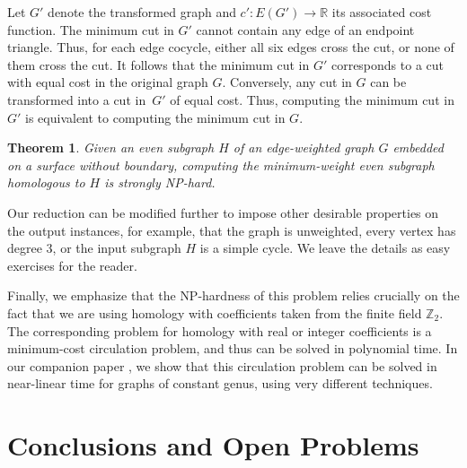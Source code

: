 \documentclass{sig-alternate}
\def\Z{\mathbb{Z}}
\def\Real{\mathbb{R}}
\newtheorem{theorem}{Theorem}[section]
\begin{document}
Let $G'$ denote the transformed graph and $c'\colon E(G')\to \Real$ its associated cost function.  The minimum cut in $G'$ cannot contain any edge of an endpoint triangle.  Thus, for each edge cocycle, either all six edges cross the cut, or none of them cross the cut.  It follows that the minimum cut in $G'$ corresponds to a cut with equal cost in the original graph $G$.  Conversely, any cut in $G$ can be transformed into a cut in~$G'$ of equal cost.  Thus, computing the minimum cut in $G'$ is equivalent to computing the minimum cut in $G$.

\begin{theorem}
Given an even subgraph $H$ of an edge-weighted graph $G$ embedded on a surface without boundary, computing the minimum-weight even subgraph homologous to $H$ is strongly {NP}-hard.
\end{theorem}

Our reduction can be modified further to impose other desirable properties on the output instances, for example, that the graph is unweighted, every vertex has degree $3$, or the input subgraph $H$ is a simple cycle.  We leave the details as easy exercises for the reader.


Finally, we emphasize that the {NP}-hardness of this problem relies crucially on the fact that we are using homology with coefficients taken from the finite field $\Z_2$.  The corresponding problem for homology with real or integer coefficients is a minimum-cost circulation problem, and thus can be solved in polynomial time.  In our companion paper \cite{cen-hfcc-09}, we show that this circulation problem can be solved in near-linear time for graphs of constant genus, using very different techniques.


\section{Conclusions and Open Problems}
\end{document}
